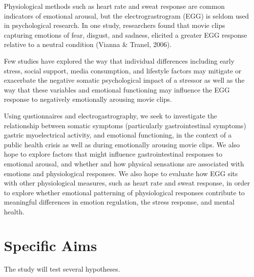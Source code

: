 \documentclass[]{book}
\begin{document}
Physiological methods such as heart rate and sweat response are common indicators of emotional arousal, but the electrograstrogram (EGG) is seldom used in psychological research. In one study, researchers found that movie clips capturing emotions of fear, disgust, and sadness, elicited a greater EGG response relative to a neutral condition (Vianna \& Tranel, 2006).

Few studies have explored the way that individual differences including early stress, social support, media consumption, and lifestyle factors may mitigate or exacerbate the negative somatic psychological impact of a stressor as well as the way that these variables and emotional functioning may influence the EGG response to negatively emotionally arousing movie clips.

Using qustionnaires and electrogastrography, we seek to investigate the relationship between somatic symptoms (particularly gastrointestinal symptoms) gastric myoelectrical activity, and emotional functioning, in the context of a public health crisis as well as during emotionally arousing movie clips. We also hope to explore factors that might influence gastrointestinal responses to emotional arousal, and whether and how physical sensations are associated with emotions and physiological responses. We also hope to evaluate how EGG sits with other physiological measures, such as heart rate and sweat response, in order to explore whether emotional patterning of physiological responses contribute to meaningful differences in emotion regulation, the stress response, and mental health.

\hypertarget{specific-aims}{%
\section{Specific Aims}\label{specific-aims}}

The study will test several hypotheses.
\end{document}
